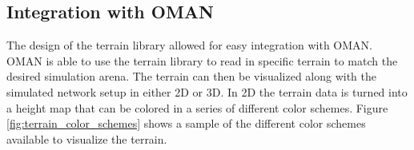 \subsection{Integration with OMAN}
The design of the terrain library allowed for easy integration with OMAN.  OMAN is able to use the terrain library to read in specific terrain to match the desired simulation arena.  The terrain can then be visualized along with the simulated network setup in either 2D or 3D.  In 2D the terrain data is turned into a height map that can be colored in a series of different color schemes.  Figure \ref{fig:terrain_color_schemes} shows a sample of the different color schemes available to visualize the terrain.  

\begin{figure}[ht]
\centering

\subfigure[]{
}
\end{figure}
